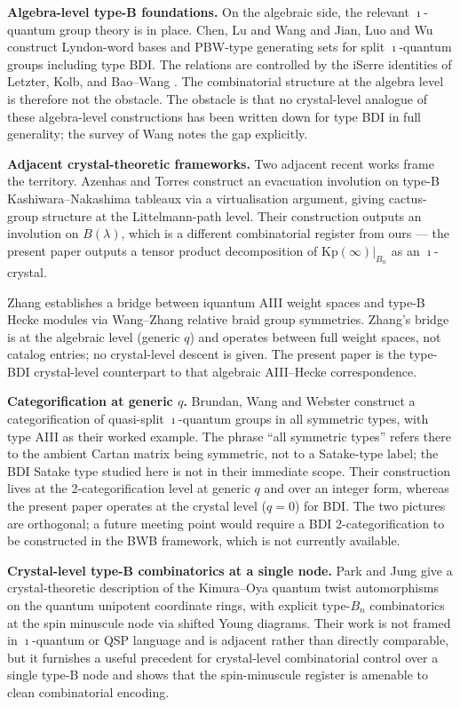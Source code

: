 \documentclass[11pt]{article}
\theoremstyle{definition}
\theoremstyle{remark}
\newcommand{\Kp}{\mathrm{Kp}}
\begin{document}
\medskip
\noindent\textbf{Algebra-level type-B foundations.}
On the algebraic side, the relevant $\imath$-quantum group theory is in place. Chen, Lu and
Wang \cite{CLW} and Jian, Luo and Wu \cite{JLW} construct Lyndon-word bases and PBW-type
generating sets for split $\imath$-quantum groups including type BDI. The relations are
controlled by the iSerre identities of Letzter, Kolb, and Bao--Wang \cite{BaoWang}. The
combinatorial structure at the algebra level is therefore not the obstacle. The obstacle is
that no crystal-level analogue of these algebra-level constructions has been written down for
type BDI in full generality; the survey of Wang \cite{Wang2024Survey} notes the gap explicitly.

\medskip
\noindent\textbf{Adjacent crystal-theoretic frameworks.}
Two adjacent recent works frame the territory. Azenhas and Torres \cite{AzenhasTorres} construct
an evacuation involution on type-B Kashiwara--Nakashima tableaux via a virtualisation argument,
giving cactus-group structure at the Littelmann-path level. Their construction outputs an
involution on $B(\lambda)$, which is a different combinatorial register from ours --- the
present paper outputs a tensor product decomposition of $\Kp(\infty)|_{B_n}$ as an
$\imath$-crystal.

Zhang \cite{Zhang2509} establishes a bridge between iquantum AIII weight spaces and type-B
Hecke modules via Wang--Zhang relative braid group symmetries. Zhang's bridge is at the
algebraic level (generic $q$) and operates between full weight spaces, not catalog entries;
no crystal-level descent is given. The present paper is the type-BDI crystal-level counterpart
to that algebraic AIII--Hecke correspondence.

\medskip
\noindent\textbf{Categorification at generic $q$.}
Brundan, Wang and Webster \cite{BWB2505} construct a categorification of quasi-split
$\imath$-quantum groups in all symmetric types, with type AIII as their worked example.
The phrase ``all symmetric types'' refers there to the ambient Cartan matrix being
symmetric, not to a Satake-type label; the BDI Satake type studied here is not in their
immediate scope. Their construction lives at the 2-categorification level at generic $q$
and over an integer form, whereas the present paper operates at the crystal level
($q = 0$) for BDI. The two pictures are orthogonal; a future meeting point would require
a BDI 2-categorification to be constructed in the BWB framework, which is not currently
available.

\medskip
\noindent\textbf{Crystal-level type-B combinatorics at a single node.}
Park and Jung \cite{ParkJung2507} give a crystal-theoretic description of the Kimura--Oya
quantum twist automorphisms on the quantum unipotent coordinate rings, with explicit
type-$B_n$ combinatorics at the spin minuscule node via shifted Young diagrams. Their
work is not framed in $\imath$-quantum or QSP language and is adjacent rather than
directly comparable, but it furnishes a useful precedent for crystal-level combinatorial
control over a single type-B node and shows that the spin-minuscule register is amenable
to clean combinatorial encoding.
\end{document}

